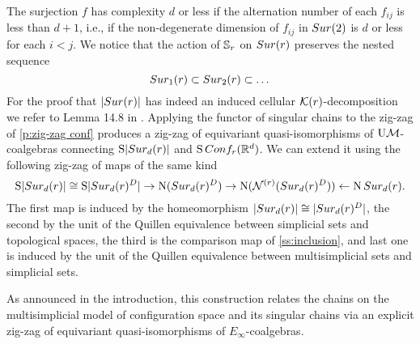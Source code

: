 The surjection $f$ has complexity $d$ or less if the alternation number of each $f_{ij}$ is less than $d+1$, i.e., if the non-degenerate dimension of $f_{ij}$ in $Sur(2)$ is $d$ or less for each $i<j$.
We notice that the action of $\mathbb{S}_r$ on $Sur(r)$ preserves the nested sequence
$$Sur_1(r) \subset Sur_2(r) \subset \dots$$
For the proof that $|Sur(r)|$
has indeed an induced cellular $\mathcal{K}(r)$-decomposition we refer to 
Lemma 14.8 in \cite{mcluresmith2004geomodel}.
Applying the functor of singular chains to the zig-zag of \cref{p:zig-zag conf} produces a zig-zag of equivariant quasi-isomorphisms of $\mathrm{U}\mathcal{M}$-coalgebras connecting $\operatorname{S}\lvert Sur_d(r)\rvert$ and $\operatorname{S}Conf_{r}(\mathbb{R}^{d})$.
We can extend it using the following zig-zag of maps of the same kind
\[
\operatorname{S}\lvert Sur_{d}(r)\rvert \cong
\operatorname{S}\lvert Sur_{d}(r)^{D}\rvert \to
\operatorname{N}(Sur_{d}(r)^D) \to
\operatorname{N}(\mathcal{N}^{(r)}(Sur_{d}(r)^D)) \leftarrow
\operatorname{N}Sur_{d}(r).
\]
The first map is induced by the homeomorphism $\lvert Sur_{d}(r)\rvert \cong \lvert Sur_{d}(r)^{D}\rvert$, the second by the unit of the Quillen equivalence between simplicial sets and topological spaces, the third is the comparison map of \cref{ss:inclusion}, and last one is induced by the unit of the Quillen equivalence between multisimplicial sets and simplicial sets.

As announced in the introduction, this construction relates the chains on the multisimplicial model of configuration space and its singular chains via an explicit zig-zag of equivariant quasi-isomorphisms of $E_\infty$-coalgebras.